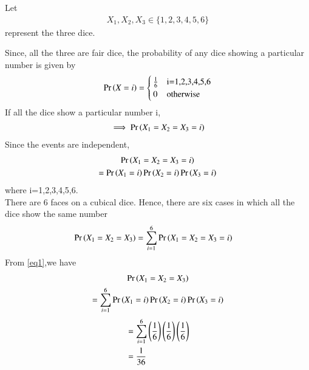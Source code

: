 Let 
\begin{align}
X_{1},X_{2},X_{3} \in \{1,2,3,4,5,6\}
\end{align}
represent the three dice.

Since, all the three are fair dice, the probability of any dice showing a particular number is given by
\begin{align}
 \Pr\left(X=i\right) =
    \begin{cases}
      \frac{1}{6} & \text{i=1,2,3,4,5,6}\\
       0 & \text{otherwise}
    \end{cases}       
\end{align}
If all the dice show a particular number i,
\begin{align}
\implies \Pr\left(X_{1} =X_{2}=X_{3}=i\right)
\end{align}
Since the events are independent, 
\begin{multline}\label{eq1}
  \pr{X_{1} =X_{2}=X_{3}=i}\\
  =  \pr{X_{1}=i}\pr{X_{2}=i}\pr{X_{3}=i}
\end{multline}
where i=1,2,3,4,5,6.\\
There are 6 faces on a cubical dice. Hence, there are six cases in which all the dice show the same number
\begin{align}
 \Pr\left(X_1 =X_2 =X_3\right)&=\sum^{6}_{i=1} \Pr\left(X_{1} =X_{2}=X_{3}=i\right)
 \end{align}
 From \eqref{eq1},we have
 \begin{multline}
\Pr\left(X_1 =X_2 =X_3\right)
\\=\sum^{6}_{i=1}\Pr\left(X_{1}=i\right)\Pr\left(X_{2}=i\right)\Pr\left(X_{3}=i\right)
\end{multline}
\begin{align}
 &=\sum^{6}_{i=1}\left(\frac{1}{6}\right)\left(\frac{1}{6}\right)\left(\frac{1}{6}\right)\\
 &=\frac{1}{36}
\end{align}